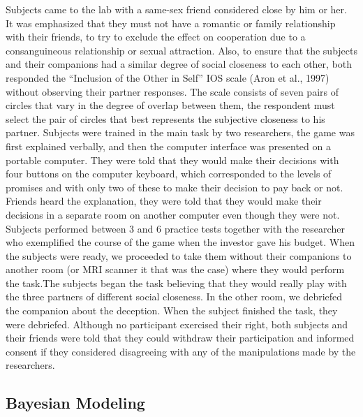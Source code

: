 \documentclass[12pt,]{article}
\begin{document}
Subjects came to the lab with a same-sex friend considered close by him
or her. It was emphasized that they must not have a romantic or family
relationship with their friends, to try to exclude the effect on
cooperation due to a consanguineous relationship or sexual attraction.
Also, to ensure that the subjects and their companions had a similar
degree of social closeness to each other, both responded the ``Inclusion
of the Other in Self'' IOS scale (Aron et al., 1997) without observing
their partner responses. The scale consists of seven pairs of circles
that vary in the degree of overlap between them, the respondent must
select the pair of circles that best represents the subjective closeness
to his partner. Subjects were trained in the main task by two
researchers, the game was first explained verbally, and then the
computer interface was presented on a portable computer. They were told
that they would make their decisions with four buttons on the computer
keyboard, which corresponded to the levels of promises and with only two
of these to make their decision to pay back or not. Friends heard the
explanation, they were told that they would make their decisions in a
separate room on another computer even though they were not. Subjects
performed between 3 and 6 practice tests together with the researcher
who exemplified the course of the game when the investor gave his
budget. When the subjects were ready, we proceeded to take them without
their companions to another room (or MRI scanner it that was the case)
where they would perform the task.The subjects began the task believing
that they would really play with the three partners of different social
closeness. In the other room, we debriefed the companion about the
deception. When the subject finished the task, they were debriefed.
Although no participant exercised their right, both subjects and their
friends were told that they could withdraw their participation and
informed consent if they considered disagreeing with any of the
manipulations made by the researchers.

\hypertarget{bayesian-modeling}{%
\subsection{Bayesian Modeling}\label{bayesian-modeling}}
\end{document}
